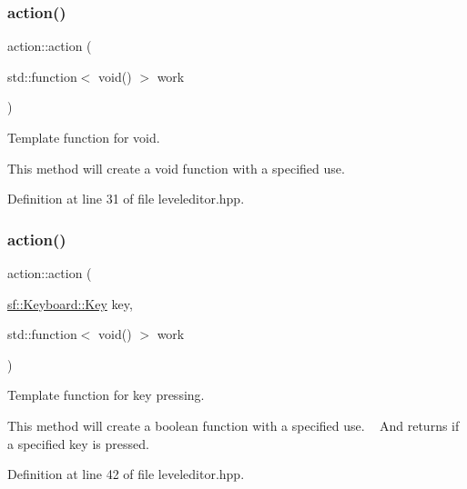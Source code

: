 \subsubsection{\texorpdfstring{action()}{action()}\hspace{0.1cm}{\footnotesize\ttfamily [2/4]}}
{\footnotesize\ttfamily action\+::action (\begin{DoxyParamCaption}\item[{std\+::function$<$ void() $>$}]{work }\end{DoxyParamCaption})\hspace{0.3cm}{\ttfamily [inline]}}



Template function for void. 

This method will create a void function with a specified use. ~\newline
 

Definition at line 31 of file leveleditor.\+hpp.

\mbox{\label{classaction_ad39321beff71da26f4aef37916974f11}} 
\subsubsection{\texorpdfstring{action()}{action()}\hspace{0.1cm}{\footnotesize\ttfamily [3/4]}}
{\footnotesize\ttfamily action\+::action (\begin{DoxyParamCaption}\item[{\hyperlink{button__actions_8hpp_a2e21a2810e34d3df6a08f9ce18ce760d}{sf\+::\+Keyboard\+::\+Key}}]{key,  }\item[{std\+::function$<$ void() $>$}]{work }\end{DoxyParamCaption})\hspace{0.3cm}{\ttfamily [inline]}}



Template function for key pressing. 

This method will create a boolean function with a specified use. ~\newline
And returns if a specified key is pressed. ~\newline


Definition at line 42 of file leveleditor.\+hpp.

\mbox{\label{classaction_a55a91caa9803002fa7ddd6e9e9e46dc6}} 
